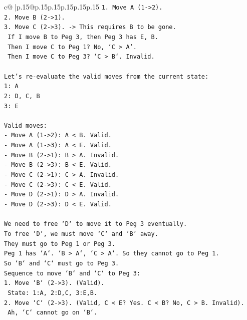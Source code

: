 \documentclass{article}
\begin{document}
{\begin{supertabular}{c@{$\;$}|p{.15\linewidth}@{}p{.15\linewidth}p{.15\linewidth}p{.15\linewidth}p{.15\linewidth}p{.15\linewidth}}
{{{\texttt{1. Move A (1{-}>2).} \\
\texttt{2. Move B (2{-}>1).} \\
\texttt{3. Move C (2{-}>3). {-}> This requires B to be gone.} \\
\texttt{   If I move B to Peg 3, then Peg 3 has E, B.} \\
\texttt{   Then I move C to Peg 1? No, `C > A`.} \\
\texttt{   Then I move C to Peg 3? `C > B`. Invalid.} \\
\\ 
\texttt{Let's re{-}evaluate the valid moves from the current state:} \\
\texttt{1: A} \\
\texttt{2: D, C, B} \\
\texttt{3: E} \\
\\ 
\texttt{Valid moves:} \\
\texttt{{-} Move A (1{-}>2): A < B. Valid.} \\
\texttt{{-} Move A (1{-}>3): A < E. Valid.} \\
\texttt{{-} Move B (2{-}>1): B > A. Invalid.} \\
\texttt{{-} Move B (2{-}>3): B < E. Valid.} \\
\texttt{{-} Move C (2{-}>1): C > A. Invalid.} \\
\texttt{{-} Move C (2{-}>3): C < E. Valid.} \\
\texttt{{-} Move D (2{-}>1): D > A. Invalid.} \\
\texttt{{-} Move D (2{-}>3): D < E. Valid.} \\
\\ 
\texttt{We need to free `D` to move it to Peg 3 eventually.} \\
\texttt{To free `D`, we must move `C` and `B` away.} \\
\texttt{They must go to Peg 1 or Peg 3.} \\
\texttt{Peg 1 has `A`. `B > A`, `C > A`. So they cannot go to Peg 1.} \\
\texttt{So `B` and `C` must go to Peg 3.} \\
\texttt{Sequence to move `B` and `C` to Peg 3:} \\
\texttt{1. Move `B` (2{-}>3). (Valid).} \\
\texttt{   State: 1:A, 2:D,C, 3:E,B.} \\
\texttt{2. Move `C` (2{-}>3). (Valid, C < E? Yes. C < B? No, C > B. Invalid).} \\
\texttt{   Ah, `C` cannot go on `B`.} \\
}}}
\end{supertabular}}
\end{document}
